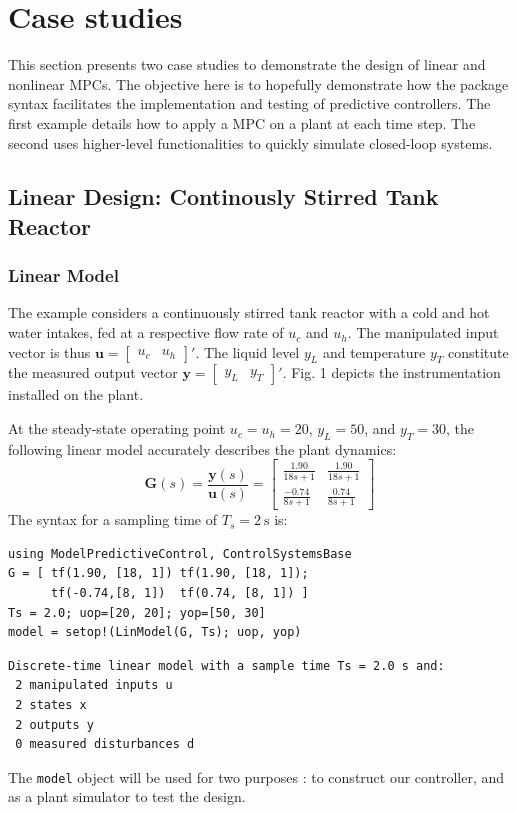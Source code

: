 \section{Case studies}

This section presents two case studies to demonstrate the design of linear and nonlinear MPCs. The objective here is to hopefully demonstrate how the package syntax facilitates the implementation and testing of predictive controllers. The first example details how to apply a MPC on a plant at each time step. The second uses higher-level functionalities to quickly simulate closed-loop systems. 

\subsection{Linear Design: Continously Stirred Tank Reactor}

\subsubsection{Linear Model}

The example considers a continuously stirred tank reactor with a cold and hot water intakes, fed at a respective flow rate of $u_c$ and $u_h$. The manipulated input vector is thus $\mathbf{u} = [\begin{smallmatrix}u_c & u_h\end{smallmatrix}]'$. The liquid level $y_L$ and temperature $y_T$ constitute the measured output vector $\mathbf{y} = [\begin{smallmatrix}y_L & y_T\end{smallmatrix}]'$. Fig. 1 depicts the instrumentation installed on the plant.

At the steady-state operating point $u_c=u_h=20$, $y_L=50$, and $y_T=30$, the following linear model accurately describes the plant dynamics:
\begin{equation}
\mathbf{G}(s) = \frac{\mathbf{y}(s)}{\mathbf{u}(s)} =
\begin{bmatrix}
    \frac{1.90}{18s+1} & \frac{1.90}{18s+1} \\[3pt]
    \frac{-0.74}{8s+1} & \frac{0.74}{8s+1}
\end{bmatrix}
\end{equation}
The syntax for a sampling time of $T_s=\SI{2}{\second}$ is:
\begin{verbatim}
using ModelPredictiveControl, ControlSystemsBase
G = [ tf(1.90, [18, 1]) tf(1.90, [18, 1]);
      tf(-0.74,[8, 1])  tf(0.74, [8, 1]) ]
Ts = 2.0; uop=[20, 20]; yop=[50, 30]
model = setop!(LinModel(G, Ts); uop, yop)
\end{verbatim}
\spacerepl
\begin{verbatim}
Discrete-time linear model with a sample time Ts = 2.0 s and:
 2 manipulated inputs u
 2 states x
 2 outputs y
 0 measured disturbances d
\end{verbatim}
The \texttt{model} object will be used for two purposes : to construct our controller, and as a plant simulator to test the design.

